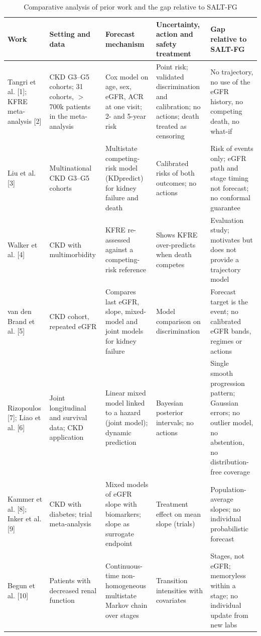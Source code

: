 \begin{table}[t]
\centering
\caption{Comparative analysis of prior work and the gap relative to SALT-FG}
\label{tab:related}
\footnotesize
\begin{tabular}{@{}p{}p{}p{}p{}p{}@{}}
\toprule
\textbf{Work} & \textbf{Setting and data} & \textbf{Forecast mechanism} & \textbf{Uncertainty, action and safety treatment} & \textbf{Gap relative to SALT-FG} \\
\midrule
Tangri et al. [1]; KFRE meta-analysis [2] & CKD G3--G5 cohorts; 31 cohorts, $>$700k patients in the meta-analysis & Cox model on age, sex, eGFR, ACR at one visit; 2- and 5-year risk & Point risk; validated discrimination and calibration; no actions; death treated as censoring & No trajectory, no use of the eGFR history, no competing death, no what-if \\
Liu et al. [3] & Multinational CKD G3--G5 cohorts & Multistate competing-risk model (KDpredict) for kidney failure and death & Calibrated risks of both outcomes; no actions & Risk of events only; eGFR path and stage timing not forecast; no conformal guarantee \\
Walker et al. [4] & CKD with multimorbidity & KFRE re-assessed against a competing-risk reference & Shows KFRE over-predicts when death competes & Evaluation study; motivates but does not provide a trajectory model \\
van den Brand et al. [5] & CKD cohort, repeated eGFR & Compares last eGFR, slope, mixed-model and joint models for kidney failure & Model comparison on discrimination & Forecast target is the event; no calibrated eGFR bands, regimes or actions \\
Rizopoulos [7]; Liao et al. [6] & Joint longitudinal and survival data; CKD application & Linear mixed model linked to a hazard (joint model); dynamic prediction & Bayesian posterior intervals; no actions & Single smooth progression pattern; Gaussian errors; no outlier model, no abstention, no distribution-free coverage \\
Kammer et al. [8]; Inker et al. [9] & CKD with diabetes; trial meta-analysis & Mixed models of eGFR slope with biomarkers; slope as surrogate endpoint & Treatment effect on mean slope (trials) & Population-average slopes; no individual probabilistic forecast \\
Begun et al. [10] & Patients with decreased renal function & Continuous-time non-homogeneous multistate Markov chain over stages & Transition intensities with covariates & Stages, not eGFR; memoryless within a stage; no individual update from new labs \\

\end{tabular}
\end{table}
